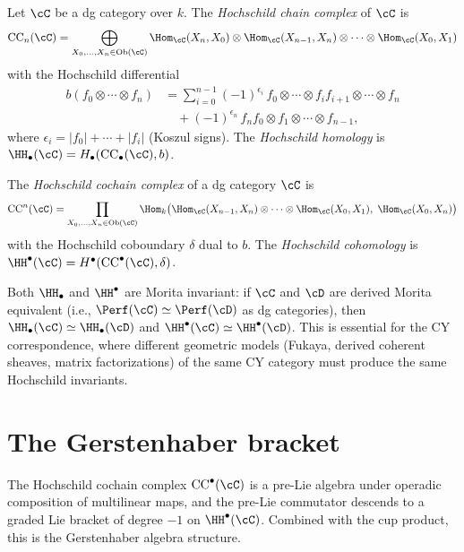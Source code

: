 \begin{definition}
\label{def:hochschild-complex}
Let $\cC$ be a dg category over $k$. The \emph{Hochschild chain complex}
of $\cC$ is
\[
 \mathrm{CC}_n(\cC)
 = \bigoplus_{X_0, \ldots, X_n \in \mathrm{Ob}(\cC)}
 \Hom_\cC(X_{n}, X_0) \otimes
 \Hom_\cC(X_{n-1}, X_n) \otimes \cdots \otimes
 \Hom_\cC(X_0, X_1)
\]
with the Hochschild differential
\begin{align*}
 b(f_0 \otimes \cdots \otimes f_n)
 &= \sum_{i=0}^{n-1} (-1)^{\epsilon_i}\,
 f_0 \otimes \cdots \otimes f_i f_{i+1} \otimes \cdots \otimes f_n \\
 &\quad + (-1)^{\epsilon_n}\, f_n f_0 \otimes f_1 \otimes \cdots \otimes f_{n-1},
\end{align*}
where $\epsilon_i = |f_0| + \cdots + |f_i|$ (Koszul signs). The
\emph{Hochschild homology} is $\HH_\bullet(\cC) = H_\bullet(\mathrm{CC}_\bullet(\cC), b)$.
\end{definition}

\begin{definition}
\label{def:hochschild-cohomology}
The \emph{Hochschild cochain complex} of a dg category $\cC$ is
\[
 \mathrm{CC}^n(\cC)
 = \prod_{X_0, \ldots, X_n \in \mathrm{Ob}(\cC)}
 \Hom_k\bigl(
 \Hom_\cC(X_{n-1}, X_n) \otimes \cdots \otimes \Hom_\cC(X_0, X_1),\;
 \Hom_\cC(X_0, X_n)
 \bigr)
\]
with the Hochschild coboundary $\delta$ dual to $b$. The
\emph{Hochschild cohomology} is
$\HH^\bullet(\cC) = H^\bullet(\mathrm{CC}^\bullet(\cC), \delta)$.
\end{definition}

\begin{remark}
\label{rem:hh-morita}
Both $\HH_\bullet$ and $\HH^\bullet$ are Morita invariant: if
$\cC$ and $\cD$ are derived Morita equivalent (i.e.,
$\Perf(\cC) \simeq \Perf(\cD)$ as dg categories), then
$\HH_\bullet(\cC) \simeq \HH_\bullet(\cD)$ and
$\HH^\bullet(\cC) \simeq \HH^\bullet(\cD)$. This is essential for
the CY correspondence, where different geometric models (Fukaya, derived
coherent sheaves, matrix factorizations) of the same CY category must
produce the same Hochschild invariants.
\end{remark}


\section{The Gerstenhaber bracket}
\label{sec:gerstenhaber-bracket}

The Hochschild cochain complex $\mathrm{CC}^\bullet(\cC)$ is a pre-Lie algebra under operadic composition of multilinear maps, and the pre-Lie commutator descends to a graded Lie bracket of degree $-1$ on $\HH^\bullet(\cC)$. Combined with the cup product, this is the Gerstenhaber algebra structure.

